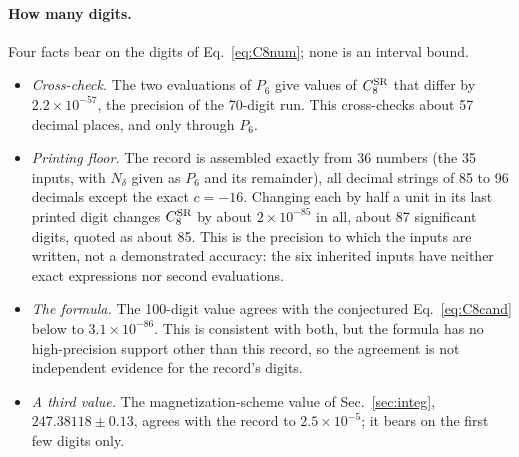 \documentclass[11pt,a4paper]{article}
\numberwithin{equation}{section}
\newcommand{\CSR}{C^{\rm SR}}
\newcommand{\sci}[2]{#1\times10^{#2}}
\begin{document}
\paragraph{How many digits.} Four facts bear on the digits of Eq.~\eqref{eq:C8num}; none is an interval bound.
\begin{itemize}
\item \emph{Cross-check.} The two evaluations of $P_6$ give values of $\CSR_8$ that differ by $\sci{2.2}{-57}$, the
 precision of the 70-digit run. This cross-checks about 57 decimal places, and only through $P_6$.
\item \emph{Printing floor.} The record is assembled exactly from 36 numbers (the 35 inputs, with $N_\delta$ given as
 $P_6$ and its remainder), all decimal strings of 85 to 96 decimals except the exact $c=-16$. Changing each by half a
 unit in its last printed digit changes $\CSR_8$ by about $\sci{2}{-85}$ in all, about 87 significant digits, quoted
 as about 85. This is the precision to which the inputs are written, not a demonstrated accuracy: the six inherited
 inputs have neither exact expressions nor second evaluations.
\item \emph{The formula.} The 100-digit value agrees with the conjectured Eq.~\eqref{eq:C8cand} below to
 $\sci{3.1}{-86}$. This is consistent with both, but the formula has no high-precision support other than this record,
 so the agreement is not independent evidence for the record's digits.
\item \emph{A third value.} The magnetization-scheme value of Sec.~\ref{sec:integ}, $247.38118\pm0.13$, agrees with the
 record to $\sci{2.5}{-5}$; it bears on the first few digits only.
\end{itemize}
\end{document}
